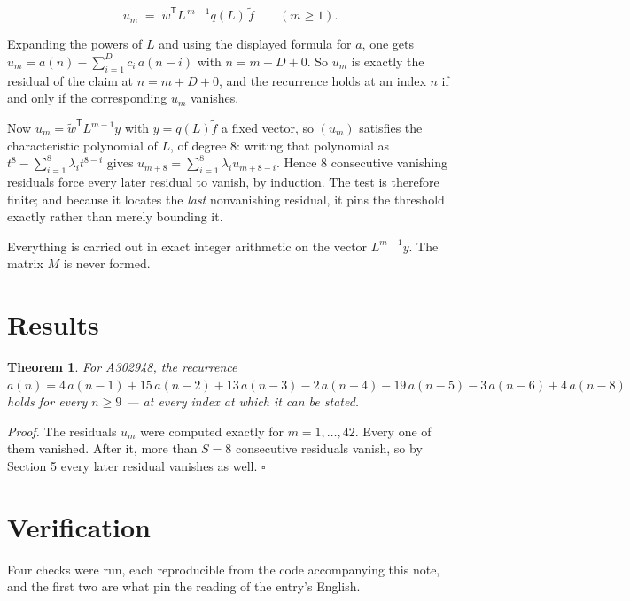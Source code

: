 \documentclass[11pt]{article}
\newtheorem{theorem}{Theorem}
\theoremstyle{definition}
\begin{document}
\[u_m \;=\; \tilde w^{\mathsf T} L^{\,m-1} q(L)\,\tilde f \qquad (m \ge 1).\]

Expanding the powers of $L$ and using the displayed formula for $a$, one gets $u_m = a(n) - \sum_{i=1}^{D} c_i\,a(n-i)$ with $n = m + D + 0$. So $u_m$ is exactly the residual of the claim at $n = m + D + 0$, and the recurrence holds at an index $n$ if and only if the corresponding $u_m$ vanishes.

Now $u_m = \tilde w^{\mathsf T} L^{m-1} y$ with $y = q(L)\tilde f$ a fixed vector, so $(u_m)$ satisfies the characteristic polynomial of $L$, of degree $8$: writing that polynomial as $t^{8} - \sum_{i=1}^{8} \lambda_i t^{8-i}$ gives $u_{m+8} = \sum_{i=1}^{8} \lambda_i u_{m+8-i}$. Hence $8$ consecutive vanishing residuals force every later residual to vanish, by induction. The test is therefore finite; and because it locates the {\itshape last} nonvanishing residual, it pins the threshold exactly rather than merely bounding it.

Everything is carried out in exact integer arithmetic on the vector $L^{m-1}y$. The matrix $M$ is never formed.

\section{Results}

\begin{theorem} For A302948, the recurrence $a(n) = 4\,a(n-1) + 15\,a(n-2) + 13\,a(n-3) - 2\,a(n-4) - 19\,a(n-5) - 3\,a(n-6) + 4\,a(n-8)$ holds for every $n \ge 9$ --- at every index at which it can be stated.\end{theorem}

{\itshape Proof.} The residuals $u_m$ were computed exactly for $m = 1,\dots,42$. Every one of them vanished. After it, more than $S = 8$ consecutive residuals vanish, so by Section 5 every later residual vanishes as well. $\square$

\section{Verification}

Four checks were run, each reproducible from the code accompanying this note, and the first two are what pin the reading of the entry's English.
\end{document}
